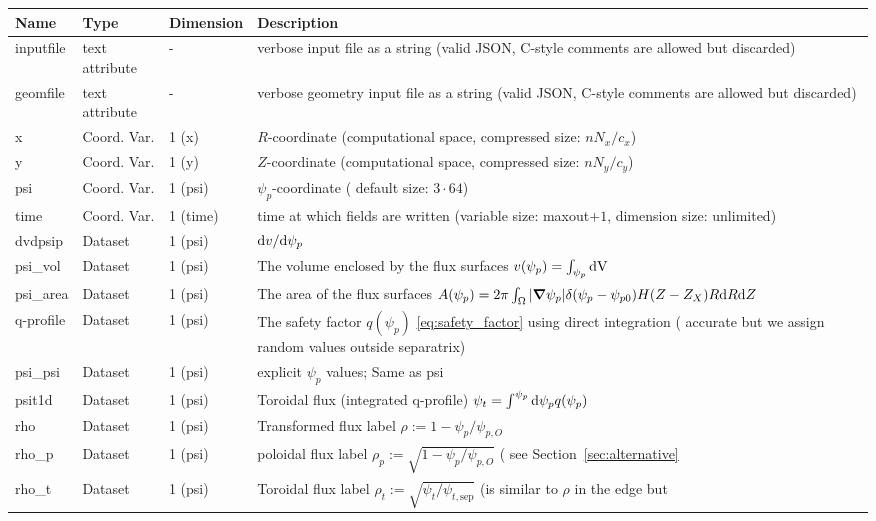 \begin{longtable}{lll>{\RaggedRight}p{7cm}}
\toprule
\rowcolor{gray!50}\textbf{Name} &  \textbf{Type} & \textbf{Dimension} & \textbf{Description}  \\ \midrule
inputfile  &     text attribute & - & verbose input file as a string (valid JSON, C-style comments are allowed but discarded) \\
geomfile   &     text attribute & - & verbose geometry input file as a string (valid JSON, C-style comments are allowed but discarded) \\
x                & Coord. Var. & 1 (x) & $R$-coordinate (computational space, compressed size: $nN_x/c_x$)\\
y                & Coord. Var. & 1 (y) & $Z$-coordinate (computational space, compressed size: $nN_y/c_y$)\\
psi              & Coord. Var. & 1 (psi) & $\psi_p$-coordinate ( default size: $3\cdot 64$) \\
time             & Coord. Var. & 1 (time)& time at which fields are written (variable size: maxout$+1$, dimension size: unlimited) \\
dvdpsip          & Dataset & 1 (psi) & $\mathrm{d} v/\mathrm{d}\psi_p$ \\
psi\_vol         & Dataset & 1 (psi) & The volume enclosed by the flux surfaces $v(\psi_p) = \int_{\psi_p} \mathrm{dV}\, $ \\
psi\_area        & Dataset & 1 (psi) & The area of the flux surfaces $A(\psi_p) = 2\pi \int_\Omega |{\boldsymbol{\nabla}}\psi_p| \delta(\psi_p - \psi_{p0}) H(Z-Z_X) R\mathrm{d} R\mathrm{d} Z$ \\
q-profile        & Dataset & 1 (psi) & The safety factor $q(\psi_p)$ \eqref{eq:safety_factor} using direct integration ( accurate but we assign random values outside separatrix) \\
psi\_psi         & Dataset & 1 (psi) & explicit $\psi_p$ values; Same as psi \\
psit1d           & Dataset & 1 (psi) & Toroidal flux (integrated q-profile) $\psi_t = \int^{\psi_p} \mathrm{d}\psi_p q(\psi_p)$ \\
rho              & Dataset & 1 (psi) & Transformed flux label $\rho:= 1 - \psi_p/\psi_{p,O}$ \\
rho\_p           & Dataset & 1 (psi) & poloidal flux label $\rho_p:= \sqrt{1 - \psi_p/\psi_{p,O}}$  ( see Section~\ref{sec:alternative}\\
    rho\_t           & Dataset & 1 (psi) & Toroidal flux label $\rho_t :=
    \sqrt{\psi_t/\psi_{t,\mathrm{sep}}}$ (is similar to $\rho$ in the edge but

\end{longtable}
